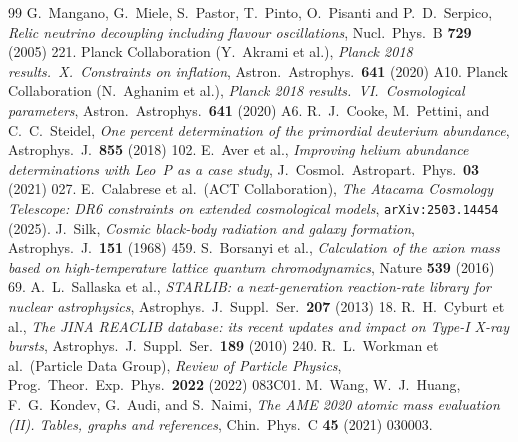 \documentclass[11pt,a4paper]{article}
\theoremstyle{plain}
\theoremstyle{definition}
\theoremstyle{remark}
\begin{document}
\begin{thebibliography}{99}
 G.~Mangano, G.~Miele, S.~Pastor, T.~Pinto, O.~Pisanti and P.~D.~Serpico, \emph{Relic neutrino decoupling including flavour oscillations}, Nucl.\ Phys.\ B \textbf{729} (2005) 221.
 Planck Collaboration (Y.~Akrami et al.), \emph{Planck 2018 results.~X.~Constraints on inflation}, Astron.\ Astrophys.\ \textbf{641} (2020) A10.
 Planck Collaboration (N.~Aghanim et al.), \emph{Planck 2018 results.~VI.~Cosmological parameters}, Astron.\ Astrophys.\ \textbf{641} (2020) A6.
 R.~J.~Cooke, M.~Pettini, and C.~C.~Steidel, \emph{One percent determination of the primordial deuterium abundance}, Astrophys.\ J.\ \textbf{855} (2018) 102.
 E.~Aver et al., \emph{Improving helium abundance determinations with Leo~P as a case study}, J.\ Cosmol.\ Astropart.\ Phys.\ \textbf{03} (2021) 027.
 E.~Calabrese et al.\ (ACT Collaboration), \emph{The Atacama Cosmology Telescope: DR6 constraints on extended cosmological models}, \texttt{arXiv:2503.14454} (2025).
 J.~Silk, \emph{Cosmic black-body radiation and galaxy formation}, Astrophys.\ J.\ \textbf{151} (1968) 459.
 S.~Borsanyi et al., \emph{Calculation of the axion mass based on high-temperature lattice quantum chromodynamics}, Nature \textbf{539} (2016) 69.
 A.~L.~Sallaska et al., \emph{STARLIB: a next-generation reaction-rate library for nuclear astrophysics}, Astrophys.\ J.\ Suppl.\ Ser.\ \textbf{207} (2013) 18.
 R.~H.~Cyburt et al., \emph{The JINA REACLIB database: its recent updates and impact on Type-I X-ray bursts}, Astrophys.\ J.\ Suppl.\ Ser.\ \textbf{189} (2010) 240.
 R.~L.~Workman et al.\ (Particle Data Group), \emph{Review of Particle Physics}, Prog.\ Theor.\ Exp.\ Phys.\ \textbf{2022} (2022) 083C01.
 M.~Wang, W.~J.~Huang, F.~G.~Kondev, G.~Audi, and S.~Naimi, \emph{The AME 2020 atomic mass evaluation (II). Tables, graphs and references}, Chin.\ Phys.\ C \textbf{45} (2021) 030003.
\end{thebibliography}
\end{document}
